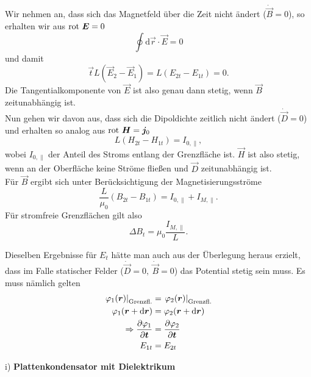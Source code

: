 Wir nehmen an, dass sich das Magnetfeld über die Zeit nicht ändert ($\dot{\vec{B}}=0$), so erhalten wir aus $\text{rot } \bm{E} = 0$
\begin{equation*}
\oint\mathrm{d}\vec{r}\cdot\vec{E} = 0 
\end{equation*}
und damit
\begin{equation*}
\vec{t}L(\vec{E}_2-\vec{E}_1)=L(E_{2t}-E_{1t})=0.
\end{equation*}
Die Tangentialkomponente von $\vec{E}$ ist also genau dann stetig, wenn $\vec{B}$ zeitunabhängig ist. \\

Nun gehen wir davon aus, dass sich die Dipoldichte zeitlich nicht ändert ($\dot{\vec{D}}=0$) und erhalten so analog aus $\text{rot } \bm{H}=\bm{j}_0$
\begin{equation*}
L(H_{2t}-H_{1t})=I_{0,\parallel},
\end{equation*}
wobei $I_{0,\parallel}$ der Anteil des Stroms entlang der Grenzfläche ist. $\vec{H}$ ist also stetig, wenn an der Oberfläche keine Ströme fließen und $\vec{D}$ zeitunabhängig ist.\\
Für $\vec{B}$ ergibt sich unter Berücksichtigung der Magnetisierungsströme
\begin{equation*}
\frac{L}{\mu_0}(B_{2t}-B_{1t})=I_{0,\parallel}+I_{M,\parallel}.
\end{equation*}
Für stromfreie Grenzflächen gilt also
\begin{equation*}
\Delta B_{t} = \mu_0\frac{I_{M,\parallel}}{L}.
\end{equation*}

Dieselben Ergebnisse für $E_t$ hätte man auch aus der Überlegung heraus erzielt, dass im Falle statischer Felder ($\dot{\vec{D}}=0,\ \dot{\vec{B}}=0$) das Potential stetig sein muss. Es muss nämlich gelten
\begin{align*}
\left.\varphi_1(\bm{r})\right|_\text{Grenzfl.} &= \left.\varphi_2(\bm{r})\right|_\text{Grenzfl.}\\
\varphi_1(\bm{r}+\mathrm{d}\bm{r}) &=\varphi_2(\bm{r}+\mathrm{d}\bm{r})	\\
\Rightarrow
\frac{\partial{\varphi_1}}{\partial{\bm{t}}} &=\frac{\partial{\varphi_2}}{\partial{\bm{t}}}\\
E_{1t} &= E_{2t}
\end{align*}

i) \textbf{ Plattenkondensator mit Dielektrikum}\\

